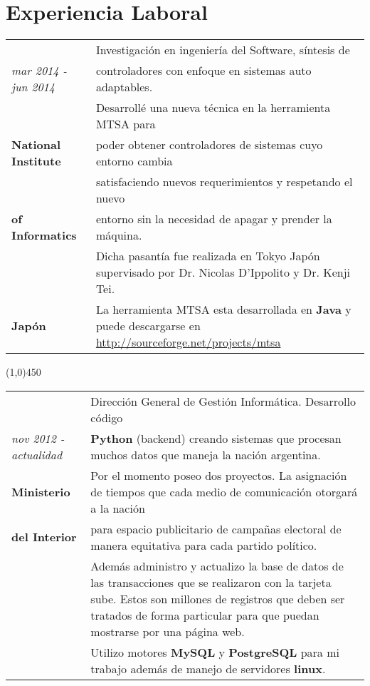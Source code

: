 \section{Experiencia Laboral}

\begin{tabular}{C{5cm}|p{11cm}}
& \large Investigación en ingeniería del Software, síntesis de \\
\large\textit{mar 2014 - jun 2014} &  \large controladores con enfoque en sistemas auto adaptables. \\
& \large Desarrollé una nueva técnica en la herramienta MTSA para \\
\large\textbf{National Institute} & \large poder obtener controladores de sistemas cuyo entorno cambia \\
& \large satisfaciendo nuevos requerimientos y respetando el nuevo \\
\large\textbf{of Informatics} & \large entorno sin la necesidad de apagar y prender la máquina. \\
& \large  Dicha pasantía fue realizada en Tokyo Japón supervisado por 
Dr. Nicolas D'Ippolito y Dr. Kenji Tei.\\
\large\textbf{Japón}  & \large La herramienta MTSA esta desarrollada en \textbf{Java} y puede
descargarse en \url{http://sourceforge.net/projects/mtsa}\\
\end{tabular}


\begin{center}
\line(1,0){450}
\end{center}
\begin{tabular}{C{5cm}|p{11cm}}
& \large Dirección General de Gestión Informática. Desarrollo código \\
\large\textit{nov 2012 - actualidad} &  \large \textbf{Python} (backend) creando sistemas que procesan muchos datos que maneja la nación argentina.\\
\large\textbf{Ministerio} & \large  Por el momento poseo dos proyectos. La asignación de tiempos que cada medio de comunicación otorgará a la nación \\
\large\textbf{del Interior} & \large para espacio publicitario de campañas electoral de manera equitativa para cada partido político.\\
& \large Además administro y actualizo la base de datos de las transacciones que se realizaron con la tarjeta sube. Estos son millones de registros que deben ser tratados de forma particular para que puedan mostrarse por una página web.\\
& \large Utilizo motores \textbf{MySQL} y \textbf{PostgreSQL} para mi trabajo además de manejo de servidores \textbf{linux}. \\
\end{tabular}

